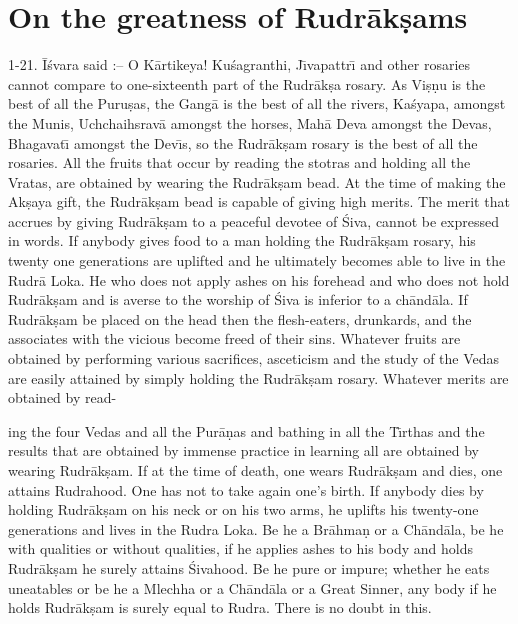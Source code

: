 \chapter{On the greatness of Rudr\=ak\d{s}ams}

1-21. \=I\'svara said :-- O K\=artikeya! Ku\'sagranthi, J\={\i}vapattr\={\i} and other rosaries cannot compare to one-sixteenth part of the Rudr\=ak\d{s}a rosary. As Vi\d{s}\d{n}u is the best of all the Puru\d{s}as, the Gang\=a is the best of all the rivers, Ka\'syapa, amongst the Munis, Uchchaihsrav\=a amongst the horses, Mah\=a Deva amongst the Devas, Bhagavat\={\i} amongst the Dev\={\i}s, so the Rudr\=ak\d{s}am rosary is the best of all the rosaries. All the fruits that occur by reading the stotras and holding all the Vratas, are obtained by wearing the Rudr\=ak\d{s}am bead. At the time of making the Ak\d{s}aya gift, the Rudr\=ak\d{s}am bead is capable of giving high merits. The merit that accrues by giving Rudr\=ak\d{s}am to a peaceful devotee of \'Siva, cannot be expressed in words. If anybody gives food to a man holding the Rudr\=ak\d{s}am rosary, his twenty one generations are uplifted and he ultimately becomes able to live in the Rudr\=a Loka. He who does not apply ashes on his forehead and who does not hold Rudr\=ak\d{s}am and is averse to the worship of \'Siva is inferior to a ch\=and\=ala. If Rudr\=ak\d{s}am be placed on the head then the flesh-eaters, drunkards, and the associates with the vicious become freed of their sins. Whatever fruits are obtained by performing various sacrifices, asceticism and the study of the Vedas are easily attained by simply holding the Rudr\=ak\d{s}am rosary. Whatever merits are obtained by read-

ing the four Vedas and all the Pur\=a\d{n}as and bathing in all the T\={\i}rthas and the results that are obtained by immense practice in learning all are obtained by wearing Rudr\=ak\d{s}am. If at the time of death, one wears Rudr\=ak\d{s}am and dies, one attains Rudrahood. One has not to take again one's birth. If anybody dies by holding Rudr\=ak\d{s}am on his neck or on his two arms, he uplifts his twenty-one generations and lives in the Rudra Loka. Be he a Br\=ahma\d{n} or a Ch\=and\=ala, be he with qualities or without qualities, if he applies ashes to his body and holds Rudr\=ak\d{s}am he surely attains \'Sivahood. Be he pure or impure; whether he eats uneatables or be he a Mlechha or a Ch\=and\=ala or a Great Sinner, any body if he holds Rudr\=ak\d{s}am is surely equal to Rudra. There is no doubt in this.

